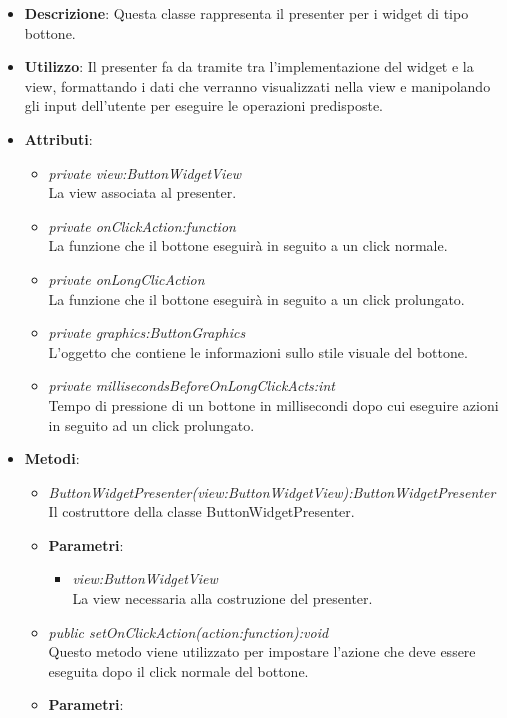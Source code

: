 \begin{itemize}
\item \textbf{Descrizione}: Questa classe rappresenta il presenter per i widget di tipo bottone.
\item \textbf{Utilizzo}: Il presenter fa da tramite tra l'implementazione del widget e la view, formattando i dati che verranno visualizzati nella view e manipolando gli input dell'utente per eseguire le operazioni predisposte.
\item \textbf{Attributi}:
	\begin{itemize}
	\item \textit{private view:ButtonWidgetView}\\
	La view associata al presenter.
	\item \textit{private onClickAction:function}\\
	La funzione che il bottone eseguirà in seguito a un click normale.
	\item \textit{private onLongClicAction}\\
	La funzione che il bottone eseguirà in seguito a un click prolungato.
	\item \textit{private graphics:ButtonGraphics}\\
	L'oggetto che contiene le informazioni sullo stile visuale del bottone.
	\item \textit{private millisecondsBeforeOnLongClickActs:int}\\
	Tempo di pressione di un bottone in millisecondi dopo cui eseguire azioni in seguito ad un click prolungato.
	\end{itemize}
\item \textbf{Metodi}:
	\begin{itemize}
	\item \textit{ButtonWidgetPresenter(view:ButtonWidgetView):ButtonWidgetPresenter}\\
	Il costruttore della classe ButtonWidgetPresenter.
		\item{\textbf{Parametri}: \begin{itemize}
		\item \textit{view:ButtonWidgetView}\\
		La view necessaria alla costruzione del presenter.
		\end{itemize}}
	\item \textit{public setOnClickAction(action:function):void}\\
	Questo metodo viene utilizzato per impostare l'azione che deve essere eseguita dopo il click normale del bottone.
		\item{\textbf{Parametri}: \begin{itemize}

\end{itemize}}
\end{itemize}
\end{itemize}
